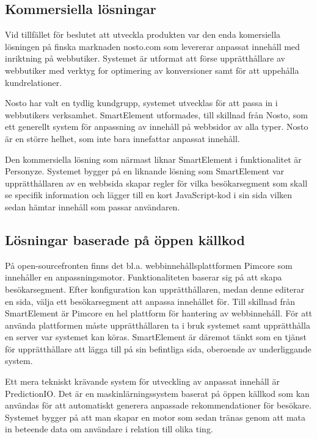 \subsection{Kommersiella lösningar}

Vid tillfället för beslutet att utveckla produkten var den enda komersiella lösningen på finska marknaden nosto.com som levererar anpassat innehåll med inriktning på webbutiker. Systemet är utformat att förse upprätthållare av webbutiker med verktyg for optimering av konversioner samt för att uppehålla kundrelationer. \citep{nosto}

Nosto har valt en tydlig kundgrupp, systemet utvecklas för att passa in i webbutikers verksamhet. SmartElement utformades, till skillnad från Nosto, som ett generellt system för anpassning av innehåll på webbsidor av alla typer. Nosto är en större helhet, som inte bara innefattar anpassat innehåll.

Den kommersiella lösning som närmast liknar SmartElement i funktionalitet är Personyze. Systemet bygger på en liknande lösning som SmartElement var upprätthållaren av en webbsida skapar regler för vilka besökarsegment som skall se specifik information och lägger till en kort JavaScript-kod i sin sida vilken sedan hämtar innehåll som passar användaren. \citep{personyze}

\subsection{Lösningar baserade på öppen källkod}

På open-sourcefronten finns det bl.a. webbinnehållsplattformen Pimcore som innehåller en anpassningsmotor. Funktionaliteten baserar sig på att skapa besökarsegment. Efter konfiguration kan upprätthållaren, medan denne editerar en sida, välja ett besökarsegment att anpassa innehållet för. \citep{pimcore}
Till skillnad från SmartElement är Pimcore en hel plattform för hantering av webbinnehåll. För att använda plattformen måste upprätthållaren ta i bruk systemet samt upprätthålla en server var systemet kan köras. SmartElement är däremot tänkt som en tjänst för upprätthållare att lägga till på sin befintliga sida, oberoende av underliggande system.

Ett mera tekniskt krävande system för utveckling av anpassat innehåll är PredictionIO. Det är en maskinlärningssystem baserat på öppen källkod som kan användas för att automatiskt generera anpassade rekommendationer för besökare. Systemet bygger på att man skapar en motor som sedan tränas genom att mata in beteende data om användare i relation till olika ting. \citep{predicionioconcepts}



